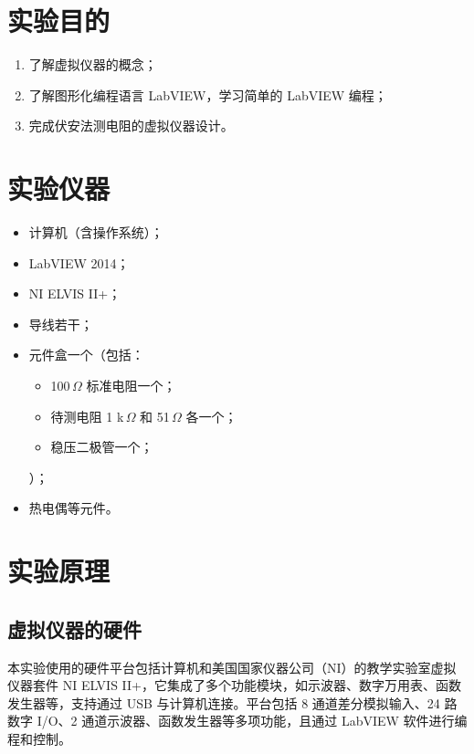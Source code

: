 \documentclass[zihao=5, UTF8]{article}
\theoremstyle{MyLineTheoremStyle} %
\theoremstyle{MyBlockTheoremStyle} %
\theoremstyle{MySubsubsectionStyle} %
\begin{document}
\section{实验目的}\thispagestyle{fancy} 

\begin{enumerate}
    \item 了解虚拟仪器的概念；
    \item 了解图形化编程语言 LabVIEW，学习简单的 LabVIEW 编程；
    \item 完成伏安法测电阻的虚拟仪器设计。
\end{enumerate}

\section{实验仪器}

\begin{itemize}
    \item 计算机（含操作系统）；
    \item LabVIEW 2014；
    \item NI ELVIS II+；
    \item 导线若干；
    \item 元件盒一个（包括：
    \begin{itemize}
        \item 100\(\, \Omega\) 标准电阻一个；
        \item 待测电阻 1 k\(\, \Omega\) 和 51\(\, \Omega\) 各一个；
        \item 稳压二极管一个；
    \end{itemize}
    ）；
    \item 热电偶等元件。
\end{itemize}


\section{实验原理}

\subsection{虚拟仪器的硬件}

本实验使用的硬件平台包括计算机和美国国家仪器公司（NI）的教学实验室虚拟仪器套件 NI ELVIS II+，它集成了多个功能模块，如示波器、数字万用表、函数发生器等，支持通过 USB 与计算机连接。平台包括 8 通道差分模拟输入、24 路数字 I/O、2 通道示波器、函数发生器等多项功能，且通过 LabVIEW 软件进行编程和控制。
\end{document}

